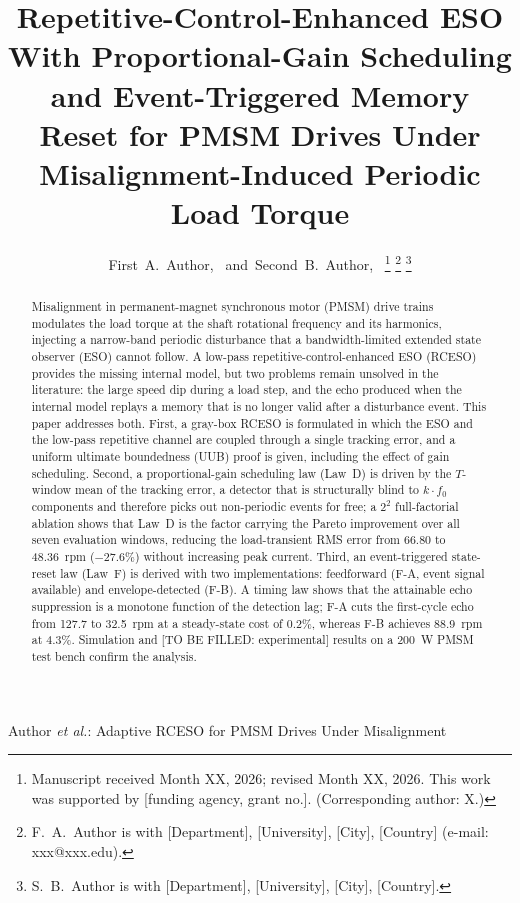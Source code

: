 \documentclass[journal]{IEEEtran}
\theoremstyle{remark}
\begin{document}
\title{Repetitive-Control-Enhanced ESO With Proportional-Gain Scheduling and
Event-Triggered Memory Reset for PMSM Drives Under Misalignment-Induced
Periodic Load Torque}

\author{First~A.~Author,~
        and~Second~B.~Author,~
\thanks{Manuscript received Month XX, 2026; revised Month XX, 2026.
This work was supported by [funding agency, grant no.]. (Corresponding author: X.)}
\thanks{F.~A.~Author is with [Department], [University], [City], [Country] (e-mail: xxx@xxx.edu).}
\thanks{S.~B.~Author is with [Department], [University], [City], [Country].}}

%
{Author \MakeLowercase{\textit{et al.}}: Adaptive RCESO for PMSM Drives Under Misalignment}

\maketitle

\begin{abstract}
Misalignment in permanent-magnet synchronous motor (PMSM) drive trains modulates
the load torque at the shaft rotational frequency and its harmonics, injecting a
narrow-band periodic disturbance that a bandwidth-limited extended state observer
(ESO) cannot follow. A low-pass repetitive-control-enhanced ESO (RCESO) provides
the missing internal model, but two problems remain unsolved in the literature:
the large speed dip during a load step, and the echo produced when the internal
model replays a memory that is no longer valid after a disturbance event. This paper
addresses both. First, a gray-box RCESO is formulated in which the ESO and the
low-pass repetitive channel are coupled through a single tracking error, and a
uniform ultimate boundedness (UUB) proof is given, including the effect of gain
scheduling. Second, a proportional-gain scheduling law (Law~D) is driven by the
$T$-window mean of the tracking error, a detector that is structurally blind to
$k\cdot f_0$ components and therefore picks out non-periodic events for free; a
$2^2$ full-factorial ablation shows that Law~D is the factor carrying the Pareto
improvement over all seven evaluation windows, reducing the load-transient RMS error
from 66.80 to 48.36~rpm ($-27.6\%$) without increasing peak current. Third, an event-triggered
state-reset law (Law~F) is derived with two implementations: feedforward (F-A,
event signal available) and envelope-detected (F-B). A timing law shows that the
attainable echo suppression is a monotone function of the detection lag; F-A cuts the
first-cycle echo from 127.7 to 32.5~rpm at a steady-state cost of 0.2\%, whereas F-B
achieves 88.9~rpm at 4.3\%.
Simulation and [TO BE FILLED: experimental] results on a 200~W PMSM test bench
confirm the analysis.
\end{abstract}
\end{document}
